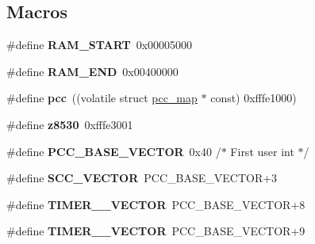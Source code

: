 \subsection*{Macros}
\begin{DoxyCompactItemize}
\item 
\mbox{\label{group__RTEMSBSPsM68kMVME147_ga2fb476d2a94e0e54f1125306010164a1}} 
\#define {\bfseries R\+A\+M\+\_\+\+S\+T\+A\+RT}~0x00005000
\item 
\mbox{\label{group__RTEMSBSPsM68kMVME147_gacedc86555cbe508b02ba7cae729e64b1}} 
\#define {\bfseries R\+A\+M\+\_\+\+E\+ND}~0x00400000
\item 
\mbox{\label{group__RTEMSBSPsM68kMVME147_ga3f138e106a6d4d521a6fbb37b6ba013c}} 
\#define {\bfseries pcc}~((volatile struct \mbox{\hyperlink{structpcc__map}{pcc\+\_\+map}} $\ast$ const) 0xfffe1000)
\item 
\mbox{\label{group__RTEMSBSPsM68kMVME147_gaa1d0aaa85bb1046417ad718b3a1966c7}} 
\#define {\bfseries z8530}~0xfffe3001
\item 
\mbox{\label{group__RTEMSBSPsM68kMVME147_gaab2935dd943605d855d1fd8a5d67a0bf}} 
\#define {\bfseries P\+C\+C\+\_\+\+B\+A\+S\+E\+\_\+\+V\+E\+C\+T\+OR}~0x40 /$\ast$ First user int $\ast$/
\item 
\mbox{\label{group__RTEMSBSPsM68kMVME147_ga3845de4996526e018ce7bfd88f92fbf9}} 
\#define {\bfseries S\+C\+C\+\_\+\+V\+E\+C\+T\+OR}~P\+C\+C\+\_\+\+B\+A\+S\+E\+\_\+\+V\+E\+C\+T\+OR+3
\item 
\mbox{\label{group__RTEMSBSPsM68kMVME147_ga9ee5f7e8dd7e8e9e1c9d90aca3e49161}} 
\#define {\bfseries T\+I\+M\+E\+R\+\_\+\_\+\+V\+E\+C\+T\+OR}~P\+C\+C\+\_\+\+B\+A\+S\+E\+\_\+\+V\+E\+C\+T\+OR+8
\item 
\mbox{\label{group__RTEMSBSPsM68kMVME147_gaa085cb113d808bd60103dd7586ba2500}} 
\#define {\bfseries T\+I\+M\+E\+R\+\_\+\_\+\+V\+E\+C\+T\+OR}~P\+C\+C\+\_\+\+B\+A\+S\+E\+\_\+\+V\+E\+C\+T\+OR+9
\item 

\end{DoxyCompactItemize}
